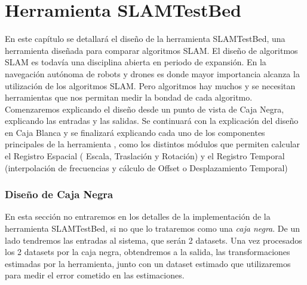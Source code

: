 \newpage
\chapter{Herramienta SLAMTestBed} \label{cap:Herramienta SLAMTestBed} %
\setcounter{section}{4}
En este capítulo se detallará el diseño de la herramienta SLAMTestBed, una herramienta diseñada para comparar algoritmos SLAM. El diseño de algoritmos SLAM es todavía una disciplina abierta en periodo de expansión. En la navegación autónoma de robots y drones es donde mayor importancia alcanza la utilización de los algoritmos SLAM. Pero algoritmos hay muchos y se necesitan herramientas que nos permitan medir la bondad de cada algoritmo.
Comenzaremos explicando el diseño desde un punto de vista de Caja Negra, explicando las entradas y las salidas. Se continuará con la explicación del diseño en Caja Blanca y se finalizará explicando cada uno de los componentes principales de la herramienta , como los distintos módulos que permiten calcular el Registro Espacial ( Escala, Traslación y Rotación) y el Registro Temporal (interpolación de frecuencias y cálculo de Offset o Desplazamiento Temporal)

\subsection{Diseño de Caja Negra}

En esta sección no entraremos en los detalles de la implementación de la herramienta SLAMTestBed, si no que lo trataremos como una \textit{caja negra}.
De un lado tendremos las entradas al sistema, que serán 2 datasets.
Una vez procesados los 2 datasets por la caja negra, obtendremos a la salida, las transformaciones estimadas por la herramienta, junto con un dataset estimado que utilizaremos para medir el error cometido en las estimaciones.


